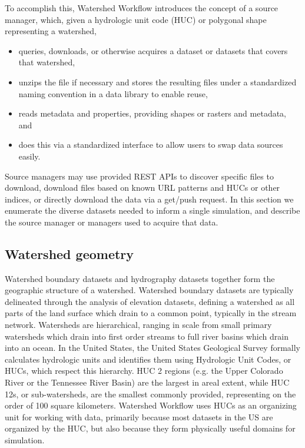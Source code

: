 \documentclass[a4paper,fleqn]{cas-dc}
\begin{document}
To accomplish this, Watershed Workflow introduces the concept of a source manager, which, given a hydrologic unit code (HUC) or polygonal shape representing a watershed,
%
\begin{itemize}
\item queries, downloads, or otherwise acquires a dataset or datasets that covers that watershed,
\item unzips the file if necessary and stores the resulting files under a standardized naming convention in a data library to enable reuse,  
\item reads metadata and properties, providing shapes or rasters and metadata, and
\item does this via a standardized interface to allow users to swap data sources easily.
\end{itemize}
%
Source managers may use provided REST APIs to discover specific files to download, download files based on known URL patterns and HUCs or other indices, or directly download the data via a get/push request.
In this section we enumerate the diverse datasets needed to inform a single simulation, and describe the source manager or managers used to acquire that data.

\subsection{Watershed geometry}\label{ssc:acquisition:geom}
%
Watershed boundary datasets and hydrography datasets together form the geographic structure of a watershed.
Watershed boundary datasets are typically delineated through the analysis of elevation datasets, defining a watershed as all parts of the land surface which drain to a common point, typically in the stream network.
Watersheds are hierarchical, ranging in scale from small primary watersheds which drain into first order streams to full river basins which drain into an ocean.
In the United States, the United States Geological Survey formally calculates hydrologic units and identifies them using Hydrologic Unit Codes, or HUCs, which respect this hierarchy.
HUC 2 regions (e.g. the Upper Colorado River or the Tennessee River Basin) are the largest in areal extent, while HUC 12s, or sub-watersheds, are the smallest commonly provided, representing on the order of 100 square kilometers.
Watershed Workflow uses HUCs as an organizing unit for working with data, primarily because most datasets in the US are organized by the HUC, but also because they form physically useful domains for simulation.
\end{document}
